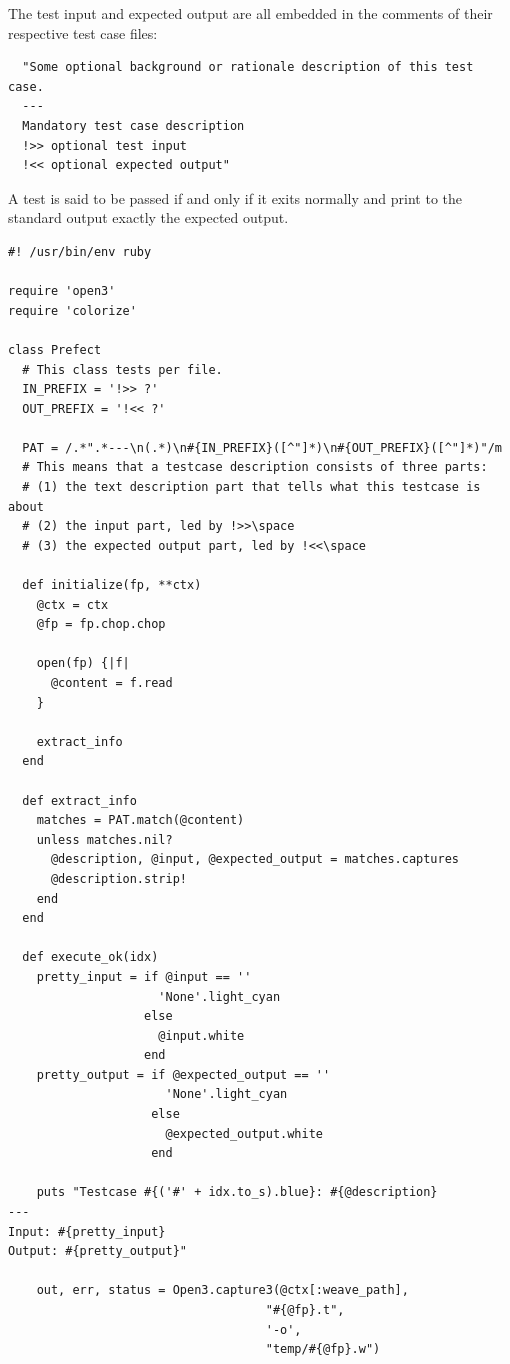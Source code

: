 \documentclass{report}
\begin{document}
The test input and expected output are all embedded in the comments of their respective test case files:

\begin{mdframed}[style=example]
\begin{verbatim}
  "Some optional background or rationale description of this test case.
  ---
  Mandatory test case description
  !>> optional test input
  !<< optional expected output"
\end{verbatim}
\end{mdframed}

A test is said to be passed if and only if it exits normally and print to the standard output exactly the expected output.

\begin{mdframed}[style=cl]
  \begin{verbatim}
#! /usr/bin/env ruby

require 'open3'
require 'colorize'

class Prefect
  # This class tests per file.
  IN_PREFIX = '!>> ?'
  OUT_PREFIX = '!<< ?'

  PAT = /.*".*---\n(.*)\n#{IN_PREFIX}([^"]*)\n#{OUT_PREFIX}([^"]*)"/m
  # This means that a testcase description consists of three parts:
  # (1) the text description part that tells what this testcase is about
  # (2) the input part, led by !>>\space
  # (3) the expected output part, led by !<<\space

  def initialize(fp, **ctx)
    @ctx = ctx
    @fp = fp.chop.chop

    open(fp) {|f|
      @content = f.read
    }

    extract_info
  end

  def extract_info
    matches = PAT.match(@content)
    unless matches.nil?
      @description, @input, @expected_output = matches.captures
      @description.strip!
    end
  end

  def execute_ok(idx)
    pretty_input = if @input == ''
                     'None'.light_cyan
                   else
                     @input.white
                   end
    pretty_output = if @expected_output == ''
                      'None'.light_cyan
                    else
                      @expected_output.white
                    end

    puts "Testcase #{('#' + idx.to_s).blue}: #{@description}
---
Input: #{pretty_input}
Output: #{pretty_output}"

    out, err, status = Open3.capture3(@ctx[:weave_path],
                                    "#{@fp}.t",
                                    '-o',
                                    "temp/#{@fp}.w")


\end{verbatim}
\end{mdframed}
\end{document}
